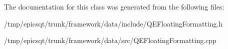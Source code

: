 The documentation for this class was generated from the following files:\begin{DoxyCompactItemize}
\item 
/tmp/epicsqt/trunk/framework/data/include/QEFloatingFormatting.h\item 
/tmp/epicsqt/trunk/framework/data/src/QEFloatingFormatting.cpp\end{DoxyCompactItemize}
